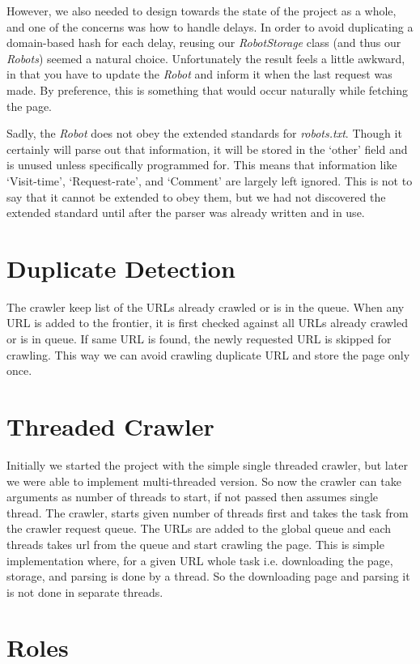 \documentclass[letterpaper,11pt,twoside]{article}
\begin{document}
However, we also needed to design towards the state of the project as a whole, and one of the concerns was how to handle delays. In order to avoid duplicating a domain-based hash for each delay, reusing our \emph{RobotStorage} class (and thus our \emph{Robots}) seemed a natural choice. Unfortunately the result feels a little awkward, in that you have to update the \emph{Robot} and inform it when the last request was made. By preference, this is something that would occur naturally while fetching the page.

Sadly, the \emph{Robot} does not obey the extended standards for \emph{robots.txt}. Though it certainly will parse out that information, it will be stored in the `other' field and is unused unless specifically programmed for. This means that information like `Visit-time', `Request-rate', and `Comment' are largely left ignored. This is not to say that it cannot be extended to obey them, but we had not discovered the extended standard until after the parser was already written and in use.

\section{Duplicate Detection}
The crawler keep list of the URLs already crawled or is in the queue. When any URL is added to the frontier, it is first checked against all URLs already crawled or is in queue. If same URL is found, the newly requested URL is skipped for crawling. This way we can avoid crawling duplicate URL and store the page only once.

\section{Threaded Crawler}
Initially we started the project with the simple single threaded crawler, but later we were able to implement multi-threaded version. So now the crawler can take arguments as number of threads to start, if not passed then assumes single thread. The crawler, starts given number of threads first and takes the task from the crawler request queue. The URLs are added to the global queue and each threads takes url from the queue and start crawling the page. This is simple implementation where, for a given URL whole task i.e. downloading the page, storage, and parsing is done by a thread. So the downloading page and parsing it is not done in separate threads. 

\section{Roles}
\end{document}

